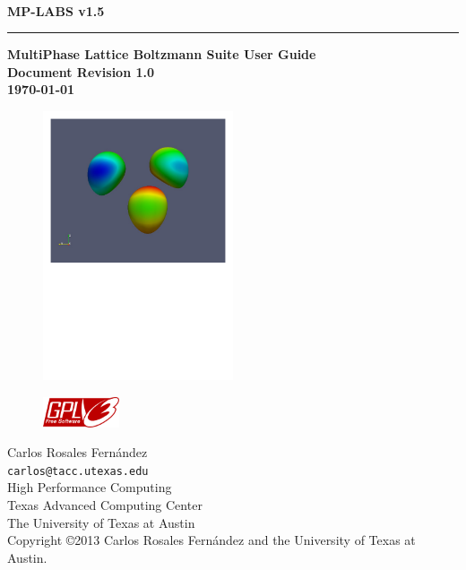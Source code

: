 \documentclass[12pt]{report}
\begin{document}
\thispagestyle{empty}	%
\verb+ +
\vspace{1em}
\begin{flushright}
\huge\bf MP-LABS v1.5\\
\rule{\textwidth}{4pt}
\large{\bf MultiPhase Lattice Boltzmann Suite User Guide\\
Document Revision 1.0\\
\today}
\end{flushright}

\vspace{1cm}
\begin{figure}[!hbt]
\centering
\includegraphics[width=0.5\textwidth]{bubble_3.pdf}
\end{figure}

\newpage
\thispagestyle{empty}
\begin{flushleft}
\begin{figure}
\includegraphics[width=0.2\textwidth]{gplv3-127x51.png}
\end{figure}
Carlos Rosales Fern\'andez\\
\verb+carlos@tacc.utexas.edu+\\
\vspace{0.5em}
High Performance Computing \\
Texas Advanced Computing Center\\
The University of Texas at Austin\\
\vspace{1cm}
Copyright \copyright 2013 Carlos Rosales Fern\'andez and the University of Texas at Austin.
\end{flushleft}
\newpage
\end{document}
